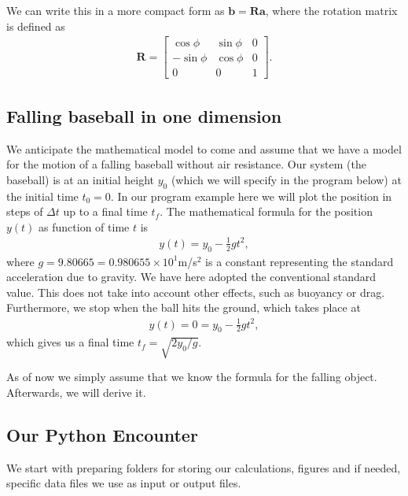 \documentclass[letterpaper,10pt,english]{sphinxmanual}
\begin{document}
We can write this in a more compact form as \(\boldsymbol{b} = \boldsymbol{R}\boldsymbol{a}\), where the rotation matrix is defined as
\begin{equation*}
\begin{split}
\boldsymbol{R} = \begin{bmatrix} \cos{\phi} & \sin{\phi} & 0 \\ -\sin{\phi} & \cos{\phi} & 0 \\ 0 & 0 & 1\end{bmatrix}.
\end{split}
\end{equation*}

\subsection{Falling baseball in one dimension}
\label{\detokenize{chapter2:falling-baseball-in-one-dimension}}
We anticipate the mathematical model to come and assume that we have a
model for the motion of a falling baseball without air resistance.
Our system (the baseball) is at an initial height \(y_0\) (which we will
specify in the program below) at the initial time \(t_0=0\). In our program example here we will plot the position in steps of \(\Delta t\) up to a final time \(t_f\).
The mathematical formula for the position \(y(t)\) as function of time \(t\) is
\begin{equation*}
\begin{split}
y(t) = y_0-\frac{1}{2}gt^2,
\end{split}
\end{equation*}
where \(g=9.80665=0.980655\times 10^1\)m/s\(^2\) is a constant representing the standard acceleration due to gravity.
We have here adopted the conventional standard value. This does not take into account other effects, such as buoyancy or drag.
Furthermore, we stop when the ball hits the ground, which takes place at
\begin{equation*}
\begin{split}
y(t) = 0= y_0-\frac{1}{2}gt^2,
\end{split}
\end{equation*}
which gives us a final time \(t_f=\sqrt{2y_0/g}\).

As of now we simply assume that   we know the formula for the falling object. Afterwards, we will derive it.


\subsection{Our Python Encounter}
\label{\detokenize{chapter2:our-python-encounter}}
We start with preparing folders for storing our calculations, figures and if needed, specific data files we use as input or output files.
\end{document}
